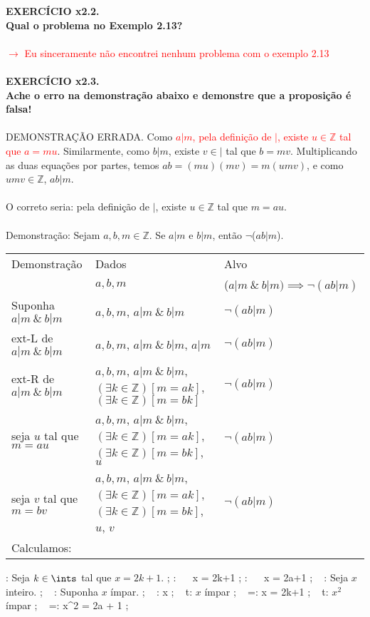 \documentclass[a4paper, 12pt]{article}
\begin{document}
\noindent\textbf{EXERCÍCIO x2.2. \\
Qual o problema no Exemplo 2.13?} \\ \\
\textcolor{red}{$\rightarrow$ Eu sinceramente não encontrei nenhum problema com o exemplo 2.13} \\ \\

\noindent\textbf{EXERCÍCIO x2.3. \\
Ache o erro na demonstração abaixo e demonstre que a proposição é falsa! } \\ \\
DEMONSTRAÇÃO ERRADA. Como \textcolor{red}{$a | m$, pela definição de $|$, existe $u \in \mathbb{Z}$ tal que $a = mu$}.
Similarmente, como $b | m$, existe $v \in \mathbb{|}$ tal que $b = mv$. Multiplicando as duas equações
por partes, temos $ab = (mu)(mv) = m(umv)$, e como $umv \in \mathbb{Z}$, $ab | m$. \\ \\
O correto seria: pela definição de $|$, existe $u \in \mathbb{Z}$ tal que $m = au$. \\ \\
Demonstração: Sejam $a, b, m \in \mathbb{Z}$. Se $a | m$ e $b | m$, então $\neg$($ab | m$).
\begin{table}[h!]
    \centering
    \begin{tabular}{|p{4cm} | p{4cm} | p{4cm} |}
    \rowcolor{gray!50}
    Demonstração & Dados & Alvo \\
    & $a, b, m$ & ($a|m~\&~b|m) \implies \neg(ab | m)$ \\ 
    Suponha $a|m~\&~b|m$& $a, b, m$, $a|m~\&~b|m$ & $\neg(ab|m)$ \\
    ext-L de $a|m~\&~b|m$ & $a, b, m$, $a|m~\&~b|m$, $a|m$ & $\neg(ab|m)$ \\
    ext-R de $a|m~\&~b|m$ & $a, b, m$, $a|m~\&~b|m$, $(\exists k \in \mathbb{Z})[ m = ak ]$, $(\exists k \in \mathbb{Z})[ m = bk ]$ & $\neg(ab|m)$ \\
    seja $u$ tal que $m = au$ & $a, b, m$, $a|m~\&~b|m$, $(\exists k \in \mathbb{Z})[ m = ak ]$, $(\exists k \in \mathbb{Z})[ m = bk ]$, $u$ & $\neg(ab|m)$ \\
    seja $v$ tal que $m = bv$ & $a, b, m$, $a|m~\&~b|m$, $(\exists k \in \mathbb{Z})[ m = ak ]$, $(\exists k \in \mathbb{Z})[ m = bk ]$, $u$, $v$ & $\neg(ab|m)$ \\
    Calculamos:  & & \\    
    \hline
    \end{tabular}
\end{table}

\repls
\maxproof : Seja $k\in\ints$ tal que $x = 2k+1$. ;
\maxgiven : \ \  {x = 2k+1}  ;
\maxgoal  : \ \  {x = 2a+1}  ;
\repl
~     : Seja $x$ inteiro. ;
~     : Suponha $x$ ímpar. ;
\givens
~     : x \in \ints ;
~    t: $x$ ímpar ;
~    =:  {x = 2k+1} ;
\goals
~    t: $x^2$ ímpar ;
~    =:  {x^2 = 2a + 1} ;
\endrepl
\end{document}
